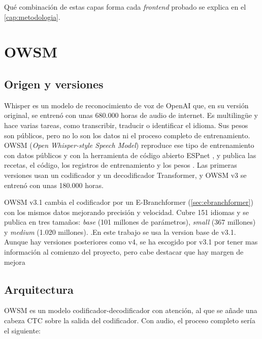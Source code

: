 Qué combinación de estas capas forma cada \textit{frontend} probado se explica en el \cref{cap:metodologia}.

\section{OWSM}
\label{sec:owsm-teoria}

\subsection{Origen y versiones}

Whisper \cite{radford2023whisper} es un modelo de reconocimiento de voz de OpenAI que, en su versión original, se entrenó con unas 680.000 horas de audio de internet. Es multilingüe y hace varias tareas, como transcribir, traducir o identificar el idioma. Sus pesos son públicos, pero no lo son los datos ni el proceso completo de entrenamiento. OWSM (\textit{Open Whisper-style Speech Model}) reproduce ese tipo de entrenamiento con datos públicos y con la herramienta de código abierto ESPnet \cite{watanabe2018espnet}, y publica las recetas, el código, los registros de entrenamiento y los pesos \cite{peng2023owsm}. Las primeras versiones usan un codificador y un decodificador Transformer, y OWSM v3 se entrenó con unas 180.000 horas.

OWSM v3.1 \cite{peng2024owsmv31} cambia el codificador por un E-Branchformer (\cref{sec:ebranchformer}) con los mismos datos mejorando precisión y velocidad. Cubre 151 idiomas y se publica en tres tamaños: \textit{base} (101 millones de parámetros), \textit{small} (367 millones) y \textit{medium} (1.020 millones). .En este trabajo se usa la version base de v3.1. Aunque hay versiones posteriores como v4, se ha escogido por v3.1 por tener mas información al comienzo del proyecto, pero cabe destacar que hay margen de mejora

\subsection{Arquitectura}
\label{sec:owsm-arquitectura}

OWSM es un modelo codificador-decodificador con atención, al que se añade una cabeza CTC sobre la salida del codificador. Con audio, el proceso completo sería el siguiente:

